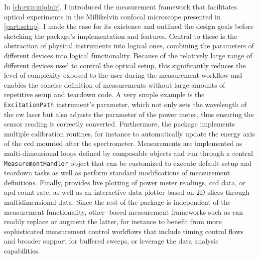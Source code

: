 In \cref{ch:exp:mjolnir}, I introduced the \mjolnir measurement framework that facilitates optical experiments in the Millikelvin confocal microscope presented in \cref{part:setup}.
I made the case for its existence and outlined the design goals before sketching the package's implementation and features.
Central to these is the abstraction of physical instruments into logical ones, combining the parameters of different devices into logical functionality.
Because of the relatively large range of different devices used to control the optical setup, this significantly reduces the level of complexity exposed to the user during the measurement workflow and enables the concise definition of measurements without large amounts of repetitive setup and teardown code.
A very simple example is the \texttt{ExcitationPath} instrument's  parameter, which not only sets the wavelength of the \gls{cw} laser but also adjusts the  parameter of the power meter, thus ensuring the sensor reading is correctly converted.
Furthermore, the package implements multiple calibration routines, for instance to automatically update the energy axis of the \gls{ccd} mounted after the spectrometer.
Measurements are implemented as multi-dimensional loops defined by composable  objects and run through a central \texttt{MeasurementHandler} object that can be customized to execute default setup and teardown tasks as well as perform standard modifications of measurement definitions.
Finally, \mjolnir provides live plotting of power meter readings, \gls{ccd} data, or \gls{apd} count rate, as well as an interactive data plotter based on 2D-slices through multidimensional data.
Since the rest of the package is independent of the measurement functionality, other \qcodes-based measurement frameworks such as  can readily replace or augment the latter, for instance to benefit from more sophisticated measurement control workflows that include timing control flows and broader support for buffered sweeps, or leverage the data analysis capabilities.

